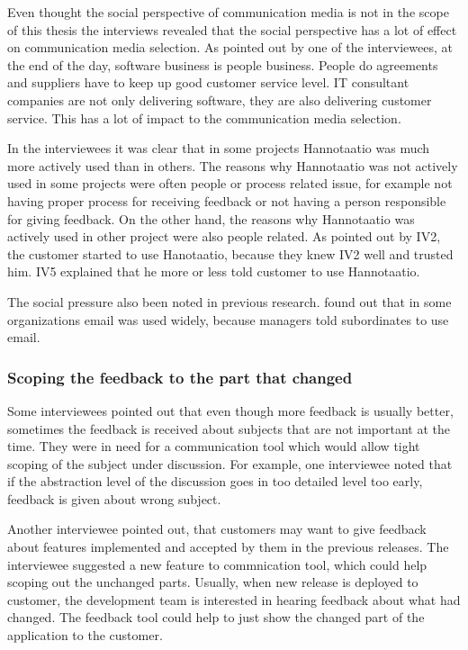 \documentclass[english,12pt,a4paper,pdftex]{article}
\begin{document}
Even thought the social perspective of communication media is not in the scope of this thesis the interviews revealed that the social perspective has a lot of effect on communication media selection. As pointed out by one of the interviewees, at the end of the day, software business is people business. People do agreements and suppliers have to keep up good customer service level. IT consultant companies are not only delivering software, they are also delivering customer service. This has a lot of impact to the communication media selection.

In the interviewees it was clear that in some projects Hannotaatio was much more actively used than in others. The reasons why Hannotaatio was not actively used in some projects were often people or process related issue, for example not having proper process for receiving feedback or not having a person responsible for giving feedback. On the other hand, the reasons why Hannotaatio was actively used in other project were also people related. As pointed out by IV2, the customer started to use Hanotaatio, because they knew IV2 well and trusted him. IV5 explained that he more or less told customer to use Hannotaatio.

The social pressure also been noted in previous research. \citet{elshinnawy1997} found out that in some organizations email was used widely, because managers told subordinates to use email.

\subsubsection{Scoping the feedback to the part that changed}

Some interviewees pointed out that even though more feedback is usually better, sometimes the feedback is received about subjects that are not important at the time. They were in need for a communication tool which would allow tight scoping of the subject under discussion. For example, one interviewee noted that if the abstraction level of the discussion goes in too detailed level too early, feedback is given about wrong subject.

Another interviewee pointed out, that customers may want to give feedback about features implemented and accepted by them in the previous releases. The interviewee suggested a new feature to commnication tool, which could help scoping out the unchanged parts. Usually, when new release is deployed to customer, the development team is interested in hearing feedback about what had changed. The feedback tool could help to just show the changed part of the application to the customer.
\end{document}
